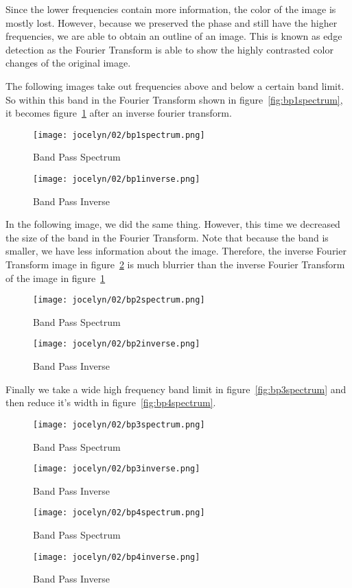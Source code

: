 \documentclass [../article.tex]{subfiles}
\begin{document}
  Since the lower frequencies contain more information, the color of
  the image is mostly lost.  However, because we preserved the phase
  and still have the higher frequencies, we are able to obtain an
  outline of an image.  This is known as edge detection as the
  Fourier Transform is able to show the highly contrasted color
  changes of the original image.

  The following images take out frequencies above and below a
  certain band limit.  So within this band in the Fourier
  Transform shown in figure~\ref{fig:bp1spectrum}, it becomes
  figure~\ref{fig:bp1inverse} after an inverse fourier transform.
  \begin{figure}[!htb]
      \texttt{[image: jocelyn/02/bp1spectrum.png]}
      \caption{Band Pass Spectrum}
      \label{fig:bp1spectrum}
    \endminipage\hfill
      \texttt{[image: jocelyn/02/bp1inverse.png]}
      \caption{Band Pass Inverse}
      \label{fig:bp1inverse}
    \endminipage
  \end{figure}

  In the following image, we did the same thing.  However, this time
  we decreased the size of the band in the Fourier Transform.  Note
  that because the band is smaller, we have less information about
  the image.  Therefore, the inverse Fourier Transform image in
  figure~\ref{fig:bp2inverse}
  is much blurrier than the inverse Fourier Transform of the image
  in figure~\ref{fig:bp1inverse}
  \begin{figure}[!htb]
      \texttt{[image: jocelyn/02/bp2spectrum.png]}
      \caption{Band Pass Spectrum}
      \label{fig:bp2spectrum}
    \endminipage\hfill
      \texttt{[image: jocelyn/02/bp2inverse.png]}
      \caption{Band Pass Inverse}
      \label{fig:bp2inverse}
    \endminipage
  \end{figure}

  Finally we take a wide high frequency band limit in
  figure~\ref{fig:bp3spectrum} and then reduce it's width
  in figure~\ref{fig:bp4spectrum}.
  \begin{figure}[!htb]
      \texttt{[image: jocelyn/02/bp3spectrum.png]}
      \caption{Band Pass Spectrum}
      \label{fig:bp3spectrum}
    \endminipage\hfill
      \texttt{[image: jocelyn/02/bp3inverse.png]}
      \caption{Band Pass Inverse}
      \label{fig:bp3inverse}
    \endminipage
  \end{figure}
  \begin{figure}[!htb]
      \texttt{[image: jocelyn/02/bp4spectrum.png]}
      \caption{Band Pass Spectrum}
      \label{fig:bp4spectrum}
    \endminipage\hfill
      \texttt{[image: jocelyn/02/bp4inverse.png]}
      \caption{Band Pass Inverse}
      \label{fig:bp4inverse}
    \endminipage
  \end{figure}
\end{document}
